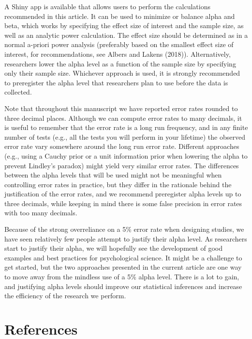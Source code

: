 \documentclass[
  english,
  ,jou, a4paper,floatsintext]{apa6}
\begin{document}
A Shiny app is available that allows users to perform the calculations recommended in this article. It can be used to minimize or balance alpha and beta, which works by specifying the effect size of interest and the sample size, as well as an analytic power calculation. The effect size should be determined as in a normal a-priori power analysis (preferably based on the smallest effect size of interest, for recommendations, see Albers and Lakens (2018)). Alternatively, researchers lower the alpha level as a function of the sample size by specifying only their sample size. Whichever approach is used, it is strongly recommended to preregister the alpha level that researchers plan to use before the data is collected.

Note that throughout this manuscript we have reported error rates rounded to three decimal places. Although we can compute error rates to many decimals, it is useful to remember that the error rate is a long run frequency, and in any finite number of tests (e.g., all the tests you will perform in your lifetime) the observed error rate vary somewhere around the long run error rate. Different approaches (e.g., using a Cauchy prior or a unit information prior when lowering the alpha to prevent Lindley's paradox) might yield very similar error rates. The differences between the alpha levels that will be used might not be meaningful when controlling error rates in practice, but they differ in the rationale behind the justification of the error rates, and we recommend preregister alpha levels up to three decimals, while keeping in mind there is some false precision in error rates with too many decimals.

Because of the strong overreliance on a 5\% error rate when designing studies, we have seen relatively few people attempt to justify their alpha level. As researchers start to justify their alpha, we will hopefully see the development of good examples and best practices for psychological science. It might be a challenge to get started, but the two approaches presented in the current article are one way to move away from the mindless use of a 5\% alpha level. There is a lot to gain, and justifying alpha levels should improve our statistical inferences and increase the efficiency of the research we perform.

\hypertarget{references}{%
\section{References}\label{references}}
\end{document}
